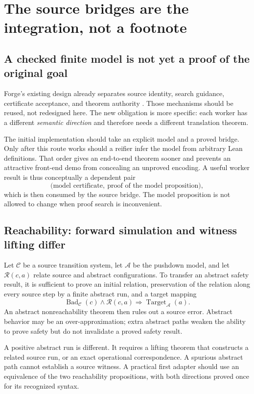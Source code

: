 \section{The source bridges are the integration, not a footnote}
\label{sec:bridges}

\subsection{A checked finite model is not yet a proof of the original goal}
Forge's existing design already separates source identity, search guidance,
certificate acceptance, and theorem authority \cite{forge-leant}. Those
mechanisms should be reused, not redesigned here. The new obligation is more
specific: each worker has a different \emph{semantic direction} and therefore
needs a different translation theorem.

The initial implementation should take an explicit model and a proved bridge.
Only after this route works should a reifier infer the model from arbitrary
Lean definitions. That order gives an end-to-end theorem sooner and prevents
an attractive front-end demo from concealing an unproved encoding.
A useful worker result is thus conceptually a dependent pair
\[
   \bigl(\text{model certificate},\ \text{proof of the model proposition}\bigr),
\]
which is then consumed by the source bridge. The model proposition is not
allowed to change when proof search is inconvenient.

\subsection{Reachability: forward simulation and witness lifting differ}
Let $\mathcal C$ be a source transition system, let $\mathcal A$ be the
pushdown model, and let $\mathcal R(c,a)$ relate source and abstract
configurations. To transfer an abstract safety result, it is sufficient to
prove an initial relation, preservation of the relation along every source
step by a finite abstract run, and a target mapping
\[
 \operatorname{Bad}_{\mathcal C}(c)\wedge\mathcal R(c,a)
 \Longrightarrow\operatorname{Target}_{\mathcal A}(a).
\]
An abstract nonreachability theorem then rules out a source error. Abstract
behavior may be an over-approximation; extra abstract paths weaken the ability
to prove safety but do not invalidate a proved safety result.

A positive abstract run is different. It requires a lifting theorem that
constructs a related source run, or an exact operational correspondence. A
spurious abstract path cannot establish a source witness. A practical first
adapter should use an equivalence of the two reachability propositions, with
both directions proved once for its recognized syntax.

